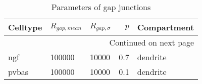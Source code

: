 \begin{longtable}{lllrl}
\caption{Parameters of gap junctions}\label{gap_junctions_parameters}\\
\toprule
Celltype &   $R_{gap, mean}$ &  $R_{gap, \sigma}$ &  $p$ &   Compartment \\
\midrule
\endhead
\midrule
\multicolumn{5}{r}{{Continued on next page}} \\
\midrule
\endfoot

\bottomrule
\endlastfoot
     ngf &  100000 &  10000 &   0.7 &  dendrite\ \\
   pvbas &  100000 &  10000 &   0.1 &  dendrite\ \\
\end{longtable}
